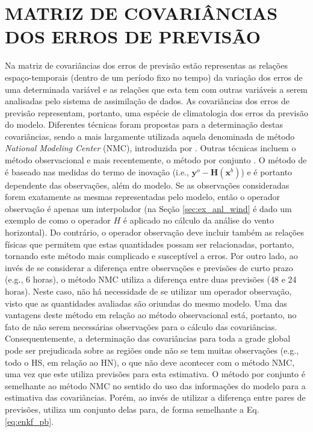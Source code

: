 \chapter{MATRIZ DE COVARIÂNCIAS DOS ERROS DE PREVISÃO}
\label{cap:matriz_cov_estatica}

Na matriz de covariâncias dos erros de previsão estão representas as relações espaço-temporais (dentro de um período fixo no tempo) da variação dos erros de uma determinada variável e as relações que esta tem com outras variáveis a serem analisadas pelo sistema de assimilação de dados. As covariâncias dos erros de previsão representam, portanto, uma espécie de climatologia dos erros da previsão do modelo. Diferentes técnicas foram propostas para a determinação destas covariâncias, sendo a mais largamente utilizada aquela denominada de método \textit{National Modeling Center} (NMC), introduzida por . Outras técnicas incluem o método observacional \cite{hollinsgsworthelonnberg/1986} e mais recentemente, o método por conjunto \cite{fisher/2003}. O método de  é baseado nas medidas do termo de inovação (i.e., $\mathbf{y}^{o}-\mathbf{H}(\mathbf{x}^{b})$) e é portanto dependente das observações, além do modelo. Se as observações consideradas forem exatamente as mesmas representadas pelo modelo, então o operador observação é apenas um interpolador (na Seção \ref{sec:ex_anl_wind} é dado um exemplo de como o operador $H$ é aplicado no cálculo da análise do vento horizontal). Do contrário, o operador observação deve incluir também as relações físicas que permitem que estas quantidades possam ser relacionadas, portanto, tornando este método mais complicado e susceptível a erros. Por outro lado, ao invés de se considerar a diferença entre observações e previsões de curto prazo (e.g., 6 horas), o método NMC utiliza a diferença entre duas previsões (48 e 24 horas). Neste caso, não há necessidade de se utilizar um operador observação, visto que as quantidades avaliadas são oriundas do mesmo modelo. Uma das vantagens deste método em relação ao método observacional está, portanto, no fato de não serem necessárias observações para o cálculo das covariâncias. Consequentemente, a determinação das covariâncias para toda a grade global pode ser prejudicada sobre as regiões onde não se tem muitas observações (e.g., todo o HS, em relação ao HN), o que não deve acontecer com o método NMC, uma vez que este utiliza previsões para esta estimativa. O método por conjunto é semelhante ao método NMC no sentido do uso das informações do modelo para a estimativa das covariâncias. Porém, ao invés de utilizar a diferença entre pares de previsões, utiliza um conjunto delas para, de forma semelhante a Eq. \ref{eq:enkf_pb}.

